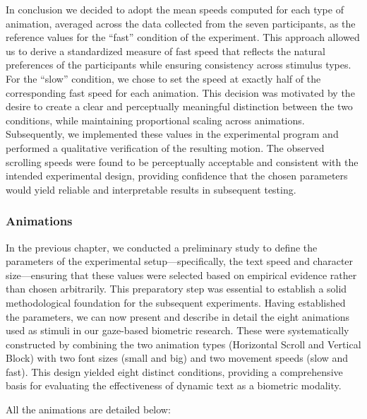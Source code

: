 \documentclass{article}
\begin{document}
In conclusion we decided to adopt the mean speeds computed for each type of animation, averaged across the data collected from the seven participants, as the reference values for the “fast” condition of the experiment.
This approach allowed us to derive a standardized measure of fast speed that reflects the natural preferences of the participants while ensuring consistency across stimulus types. 
For the “slow” condition, we chose to set the speed at exactly half of the corresponding fast speed for each animation. 
This decision was motivated by the desire to create a clear and perceptually meaningful distinction between the two conditions, while maintaining proportional scaling across animations. 
Subsequently, we implemented these values in the experimental program and performed a qualitative verification of the resulting motion. 
The observed scrolling speeds were found to be perceptually acceptable and consistent with the intended experimental design, providing confidence that the chosen parameters would yield reliable and interpretable results in subsequent testing.

\subsubsection{Animations}

In the previous chapter, we conducted a preliminary study to define the parameters of the experimental setup—specifically, the text speed and character size—ensuring that these values were selected based on empirical evidence rather than chosen arbitrarily. 
This preparatory step was essential to establish a solid methodological foundation for the subsequent experiments. 
Having established the parameters, we can now present and describe in detail the eight animations used as stimuli in our gaze-based biometric research. 
These were systematically constructed by combining the two animation types (Horizontal Scroll and Vertical Block) with two font sizes (small and big) and two movement speeds (slow and fast). 
This design yielded eight distinct conditions, providing a comprehensive basis for evaluating the effectiveness of dynamic text as a biometric modality.

All the animations are detailed below:
\end{document}
